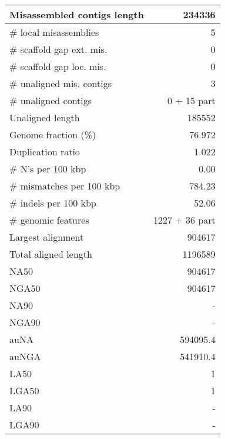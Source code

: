 \documentclass[12pt,a4paper]{article}
\begin{document}
\begin{table}[ht]
\begin{center}
\begin{tabular}{|l*{1}{|r}|}
Misassembled contigs length & 234336 \\ \hline
\# local misassemblies & 5 \\ \hline
\# scaffold gap ext. mis. & 0 \\ \hline
\# scaffold gap loc. mis. & 0 \\ \hline
\# unaligned mis. contigs & 3 \\ \hline
\# unaligned contigs & 0 + 15 part \\ \hline
Unaligned length & 185552 \\ \hline
Genome fraction (\%) & 76.972 \\ \hline
Duplication ratio & 1.022 \\ \hline
\# N's per 100 kbp & 0.00 \\ \hline
\# mismatches per 100 kbp & 784.23 \\ \hline
\# indels per 100 kbp & 52.06 \\ \hline
\# genomic features & 1227 + 36 part \\ \hline
Largest alignment & 904617 \\ \hline
Total aligned length & 1196589 \\ \hline
NA50 & 904617 \\ \hline
NGA50 & 904617 \\ \hline
NA90 & - \\ \hline
NGA90 & - \\ \hline
auNA & 594095.4 \\ \hline
auNGA & 541910.4 \\ \hline
LA50 & 1 \\ \hline
LGA50 & 1 \\ \hline
LA90 & - \\ \hline
LGA90 & - \\ \hline
\end{tabular}
\end{center}
\end{table}
\end{document}
